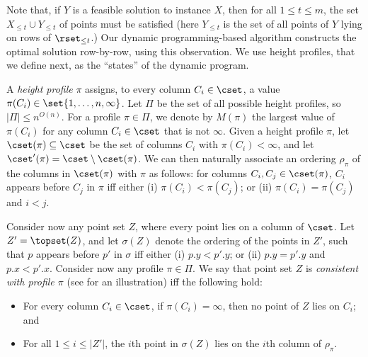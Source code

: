\documentclass{toc}
\begin{document}
Note that, if $Y$ is a feasible solution to instance $X$, then for all $1\leq t\leq m$, the set $X_{\leq t}\cup Y_{\leq t}$ of points must be satisfied (here $Y_{\leq t}$ is the set of all points of $Y$ lying on rows of $\rset_{\leq t}$.) Our dynamic programming-based algorithm constructs the optimal solution row-by-row, using this observation. We use height profiles, that we define next, as the ``states'' of the dynamic program.

 
%


A \emph{height profile} $\pi$ assigns, to every column $C_i\in \cset$, a value $\pi(C_i)\in \set{1,\ldots,n,\infty}$. Let $\Pi$ be the set of all possible height profiles, so $|\Pi|\leq n^{O(n)}$. For a profile $\pi\in \Pi$, we denote by $M(\pi)$ the largest value of $\pi(C_i)$ for any column $C_i\in \cset$ that is not $\infty$. Given a height profile $\pi$, let $\cset(\pi)\subseteq \cset$ be the set of columns $C_i$ with $\pi(C_i)<\infty$, and let $\cset'(\pi)=\cset\setminus\cset(\pi)$. We can then naturally associate an ordering $\rho_{\pi}$ of the columns in $\cset(\pi)$ with $\pi$ as follows: for columns $C_i,C_j\in \cset(\pi)$, $C_i$ appears before $C_j$ in $\pi$ iff either  (i) $\pi(C_i)<\pi(C_{j})$; or (ii) $\pi(C_i)=\pi(C_{j})$ and $i<j$.

Consider now any point set $Z$, where every point lies on a column of $\cset$. Let $Z'=\topset(Z)$, and let $\sigma(Z)$ denote the ordering of the points in $Z'$, such that $p$ appears before $p'$ in $\sigma$ iff either (i) $p.y<p'.y$; or (ii) $p.y=p'.y$ and $p.x<p'.x$. 
Consider now any profile  $\pi\in \Pi$.
We say that point set $Z$ is \emph{consistent with profile $\pi$} (see  for an illustration) iff the following hold:

\begin{itemize}
	\item For every column $C_i\in \cset$, if $\pi(C_i)=\infty$, then no point of $Z$ lies on $C_i$; and
	\item For all $1\leq i\leq |Z'|$, the $i$th point in $\sigma(Z)$ lies on the $i$th column of $\rho_{\pi}$.
\end{itemize}
\end{document}
